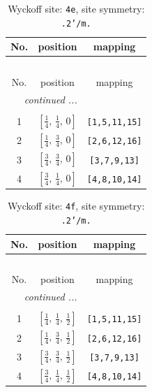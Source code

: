 \documentclass[fleqn,8pt]{jsarticle}
\begin{document}
\renewcommand{\arraystretch}{1.2}
\begin{longtable}{ccc}
\caption{Wyckoff site: {\tt 4e}, site symmetry: {\tt .2'/m.}}
 \\
 \hline \hline
No. & position & mapping \\ \hline \endfirsthead

\multicolumn{2}{l}{\tablename\ \thetable{}} \\
 \hline \hline
No. & position & mapping \\ \hline \endhead

 \hline \hline
\multicolumn{2}{r}{\footnotesize\it continued ...} \\ \endfoot

 \hline \hline
\multicolumn{2}{r}{} \\ \endlastfoot

1 & $\left[ \frac{1}{4},\, \frac{1}{4},\, 0 \right]$ & {\tt [1,5,11,15]} \\ \hline
2 & $\left[ \frac{1}{4},\, \frac{3}{4},\, 0 \right]$ & {\tt [2,6,12,16]} \\ \hline
3 & $\left[ \frac{3}{4},\, \frac{3}{4},\, 0 \right]$ & {\tt [3,7,9,13]} \\ \hline
4 & $\left[ \frac{3}{4},\, \frac{1}{4},\, 0 \right]$ & {\tt [4,8,10,14]} \\
\end{longtable}
\renewcommand{\arraystretch}{1.2}
\begin{longtable}{ccc}
\caption{Wyckoff site: {\tt 4f}, site symmetry: {\tt .2'/m.}}
 \\
 \hline \hline
No. & position & mapping \\ \hline \endfirsthead

\multicolumn{2}{l}{\tablename\ \thetable{}} \\
 \hline \hline
No. & position & mapping \\ \hline \endhead

 \hline \hline
\multicolumn{2}{r}{\footnotesize\it continued ...} \\ \endfoot

 \hline \hline
\multicolumn{2}{r}{} \\ \endlastfoot

1 & $\left[ \frac{1}{4},\, \frac{1}{4},\, \frac{1}{2} \right]$ & {\tt [1,5,11,15]} \\ \hline
2 & $\left[ \frac{1}{4},\, \frac{3}{4},\, \frac{1}{2} \right]$ & {\tt [2,6,12,16]} \\ \hline
3 & $\left[ \frac{3}{4},\, \frac{3}{4},\, \frac{1}{2} \right]$ & {\tt [3,7,9,13]} \\ \hline
4 & $\left[ \frac{3}{4},\, \frac{1}{4},\, \frac{1}{2} \right]$ & {\tt [4,8,10,14]} \\
\end{longtable}
\end{document}
